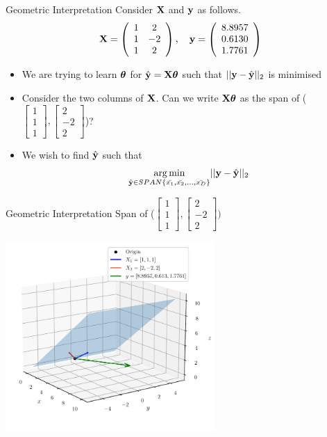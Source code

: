 \documentclass{beamer}
\begin{document}
\begin{frame}{Geometric Interpretation}
Consider $\mathbf{X}$ and $\mathbf{y}$ as follows. 
$$
\mathbf{X}=\left(\begin{array}{cc}
{1} & {2} \\
{1} & {-2} \\
{1} & {2}
\end{array}\right), \quad \mathbf{y}=\left(\begin{array}{c}
{8.8957} \\
{0.6130} \\
{1.7761}
\end{array}\right)
$$
\begin{itemize}[<+->]
\item We are trying to learn $\boldsymbol{\theta}$ for $\hat{\mathbf{y}}=\mathbf{X}\boldsymbol{\theta}$ such that $\vert \vert \mathbf{y} - \hat{\mathbf{y}} \vert \vert_{2}$ is minimised
\item Consider the two columns of $\mathbf{X}$. Can we write $\mathbf{X}\boldsymbol{\theta}$ as the span of ($\begin{bmatrix}
1 \\1\\1
\end{bmatrix}, \begin{bmatrix}
2 \\-2\\2
\end{bmatrix}$)?
\item We wish to find $\hat{\mathbf{y}}$ such that 
$$
\underset{\hat{\mathbf{y}} \in SPAN\{\bar{x_{1}},\bar{x_{2}},\dots,\bar{x_{D}}\} } {\operatorname*{arg\,min}} \vert \vert \mathbf{y} - \hat{\mathbf{y}} \vert \vert_{2}
$$
\end{itemize}

\end{frame}


\begin{frame}{Geometric Interpretation}
Span of ($\begin{bmatrix}
1 \\1\\1
\end{bmatrix}, \begin{bmatrix}
2 \\-2\\2
\end{bmatrix}) $


\includegraphics[width=0.6\textwidth]{../assets/linear-regression/figures/geometric-2.pdf}

\end{frame}
\end{document}
